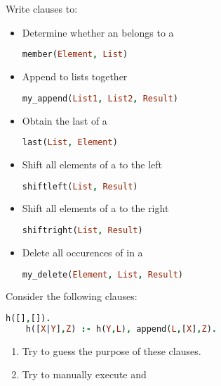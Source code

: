 \documentclass{../../../tp}
\begin{document}
\begin{instruction}
	
	Write \prolog clauses to:
	
	\begin{itemize}
	\item Determine whether an  belongs to a 
	\begin{lstlisting}[language=prolog] 
	member(Element, List) 
	\end{lstlisting}		
	
	\item Append to lists together 
	\begin{lstlisting}[language=prolog] 
	my_append(List1, List2, Result) 
	\end{lstlisting}
	
	\item  Obtain the last  of a 
	\begin{lstlisting}[language=prolog] 
	last(List, Element) 
	\end{lstlisting}
	
	
	\item  Shift all elements of a  to the left
	\begin{lstlisting}[language=prolog] 
	shiftleft(List, Result) 
	\end{lstlisting}

	\item  Shift all elements of a  to the right
	\begin{lstlisting}[language=prolog] 
	shiftright(List, Result) 
	\end{lstlisting}	
	
	\item  Delete all occurences of  in a 
	\begin{lstlisting}[language=prolog] 
	my_delete(Element, List, Result) 
	\end{lstlisting}		
	\end{itemize}
	
\end{instruction}

\begin{instruction}
	Consider the following clauses:
	\begin{lstlisting}[language=prolog] 
	h([],[]).
	h([X|Y],Z) :- h(Y,L), append(L,[X],Z). 
	\end{lstlisting}	
	
	\begin{enumerate}
		\item Try to guess the purpose of these clauses.
		\item Try to manually execute  and 
	\end{enumerate}
	
\end{instruction}
\end{document}
